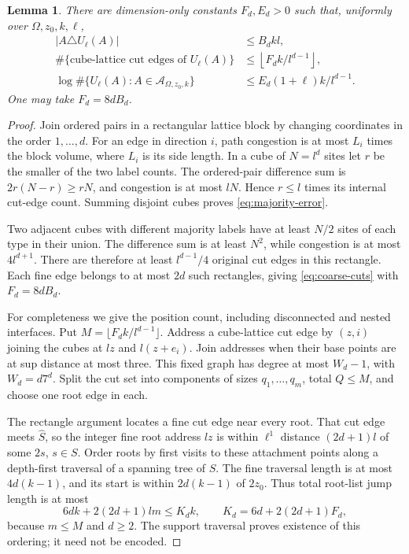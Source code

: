 \documentclass[11pt,a4paper]{article}
\newtheorem{lemma}[theorem]{Lemma}
\numberwithin{equation}{section}
\begin{document}
\begin{lemma}\label{lem:entropy}
There are dimension-only constants $F_d,E_d>0$ such that, uniformly
over $\Omega,z_0,k,\ell$,
\begin{align}
 |A\triangle U_\ell(A)|&\le B_dkl,\label{eq:majority-error}\\
 \#\{\text{cube-lattice cut edges of }U_\ell(A)\}
 &\le \left\lfloor F_d k/l^{d-1}\right\rfloor,\label{eq:coarse-cuts}\\
 \log\#\{U_\ell(A):A\in\mathcal A_{\Omega,z_0,k}\}
 &\le E_d(1+\ell)k/l^{d-1}.\label{eq:entropy}
\end{align}
One may take $F_d=8dB_d$.
\end{lemma}
\begin{proof}
Join ordered pairs in a rectangular lattice block by changing coordinates
in the order $1,\ldots,d$. For an edge in direction $i$, path congestion
is at most $L_i$ times the block volume, where $L_i$ is its side length.
In a cube of $N=l^d$ sites let $r$ be the smaller of the two label counts.
The ordered-pair difference sum is $2r(N-r)\ge rN$, and congestion is
at most $lN$. Hence $r\le l$ times its internal cut-edge count.
Summing disjoint cubes proves \eqref{eq:majority-error}.

Two adjacent cubes with different majority labels have at least $N/2$
sites of each type in their union. The difference sum is at least $N^2$,
while congestion is at most $4l^{d+1}$. There are therefore at least
$l^{d-1}/4$ original cut edges in this rectangle.
Each fine edge belongs to at most $2d$ such rectangles, giving
\eqref{eq:coarse-cuts} with $F_d=8dB_d$.

For completeness we give the position count, including disconnected and
nested interfaces. Put $M=\lfloor F_d k/l^{d-1}\rfloor$.
Address a cube-lattice cut edge by $(z,i)$ joining the cubes at $lz$ and
$l(z+e_i)$. Join addresses when their base points are at sup distance
at most three. This fixed graph has degree at most $W_d-1$, with
$W_d=d7^d$. Split the cut set into components of sizes
$q_1,\ldots,q_m$, total $Q\le M$, and choose one root edge in each.

The rectangle argument locates a fine cut edge near every root.
That cut edge meets $\widehat S$, so the integer fine root address $lz$
is within $\ell^1$ distance $(2d+1)l$ of some $2s$, $s\in S$.
Order roots by first visits to these attachment points along a
depth-first traversal of a spanning tree of $S$.
The fine traversal length is at most $4d(k-1)$, and its start is within
$2d(k-1)$ of $2z_0$. Thus total root-list jump length is at most
\[
 6dk+2(2d+1)lm\le K_d k,\qquad
 K_d=6d+2(2d+1)F_d,
\]
because $m\le M$ and $d\ge2$.
The support traversal proves existence of this ordering; it need not
be encoded.


\end{proof}
\end{document}
